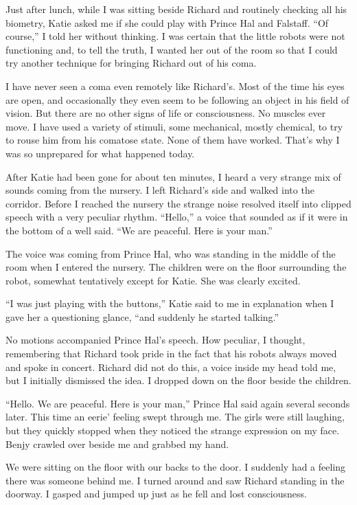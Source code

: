 \documentclass[]{article}
\begin{document}
{Just after lunch, while I was sitting beside Richard and routinely checking all his biometry, Katie asked me if she could play with Prince Hal and Falstaff.  “Of course,” I told her without thinking.  I was certain that the little robots were not functioning and, to tell the truth, I wanted her out of the room so that I could try another technique for bringing Richard out of his coma.

I have never seen a coma even remotely like Richard’s.  Most of the time his eyes are open, and occasionally they even seem to be following an object in his field of vision.  But there are no other signs of life or consciousness.  No muscles ever move.  I have used a variety of stimuli, some mechanical, mostly chemical, to try to rouse him from his comatose state.  None of them have worked.  That’s why I was so unprepared for what happened today.

After Katie had been gone for about ten minutes, I heard a very strange mix of sounds coming from the nursery.  I left Richard’s side and walked into the corridor.  Before I reached the nursery the strange noise resolved itself into clipped speech with a very peculiar rhythm.  “Hello,” a voice that sounded as if it were in the bottom of a well said.  “We are peaceful.  Here is your man.”

The voice was coming from Prince Hal, who was standing in the middle of the room when I entered the nursery.  The children were on the floor surrounding the robot, somewhat tentatively except for Katie.  She was clearly excited.

“I was just playing with the buttons,” Katie said to me in explanation when I gave her a questioning glance, “and suddenly he started talking.”

No motions accompanied Prince Hal’s speech.  How peculiar, I thought, remembering that Richard took pride in the fact that his robots always moved and spoke in concert.  Richard did not do this, a voice inside my head told me, but I initially dismissed the idea.  I dropped down on the floor beside the children.

“Hello.  We are peaceful.  Here is your man,” Prince Hal said again several seconds later.  This time an eerie’ feeling swept through me.  The girls were still laughing, but they quickly stopped when they noticed the strange expression on my face.  Benjy crawled over beside me and grabbed my hand.

We were sitting on the floor with our backs to the door.  I suddenly had a feeling there was someone behind me.  I turned around and saw Richard standing in the doorway.  I gasped and jumped up just as he fell and lost consciousness.

}
\end{document}
